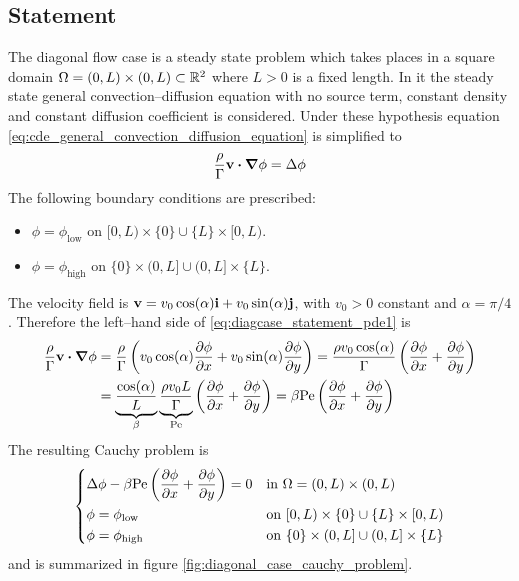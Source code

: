 
\subsection{Statement}

The diagonal flow case is a steady state problem which takes places in a square domain $\Omega = (0,L) \times (0,L) \subset \mathbb{R}^2$ where $L > 0$ is a fixed length. In it the steady state general convection--diffusion equation with no source term, constant density and constant diffusion coefficient is considered. Under these hypothesis equation \eqref{eq:cde_general_convection_diffusion_equation} is simplified to
\begin{equation} \label{eq:diagcase_statement_pde1}
	\frac{\rho}{\Gamma} \vb{v} \vdot \grad{\phi} = \Delta{\phi}
\end{equation}
The following boundary conditions are prescribed:
\begin{itemize}[topsep=0pt]
	\item $\phi = \phi_\text{low}$ on $[0,L) \times \{ 0 \} \cup \{ L \} \times [0,L)$.
	\item $\phi = \phi_\text{high}$ on $\{ 0 \} \times (0,L] \cup (0,L] \times \{ L \}$.
\end{itemize}
The velocity field is $\vb{v} = v_0 \cos(\alpha) \vb{i} + v_0 \sin(\alpha) \vb{j}$, with $v_0 > 0$ constant and $\alpha = \pi / 4$. Therefore the left--hand side of \eqref{eq:diagcase_statement_pde1} is
\begin{align}
	\frac{\rho}{\Gamma} \vb{v} \vdot \grad{\phi} &= 
	\frac{\rho}{\Gamma} 
	\left( v_0 \cos(\alpha) \pdv{\phi}{x} + v_0 \sin(\alpha) \pdv{\phi}{y} \right) = 
	\frac{\rho v_0 \cos(\alpha)}{\Gamma} \left( \pdv{\phi}{x} + \pdv{\phi}{y} \right) \\
	&= 
	\underbrace{\frac{\cos(\alpha)}{L}}_{\beta} 
	\underbrace{\frac{\rho v_0 L}{\Gamma}}_{\mathrm{Pe}} 
	\left( \pdv{\phi}{x} + \pdv{\phi}{y} \right) = 
	\beta \mathrm{Pe} \left( \pdv{\phi}{x} + \pdv{\phi}{y} \right)
\end{align}
The resulting Cauchy problem is
\begin{equation} \label{eq:diagonal_case_cauchy_problem}
	\left\{
	\begin{aligned}
		&\Delta \phi - \beta \mathrm{Pe} \left( \pdv{\phi}{x} + \pdv{\phi}{y} \right) = 0 &
		&\text{in } \Omega = (0,L) \times (0,L) \\
		&\phi = \phi_\text{low} &
		&\text{on } [0,L) \times \{ 0 \} \cup \{ L \} \times [0,L) \\
		&\phi = \phi_\text{high} &
		&\text{on } \{ 0 \} \times (0,L] \cup (0,L] \times \{ L \}
	\end{aligned}
	\right.
\end{equation}
and is summarized in figure \ref{fig:diagonal_case_cauchy_problem}.

